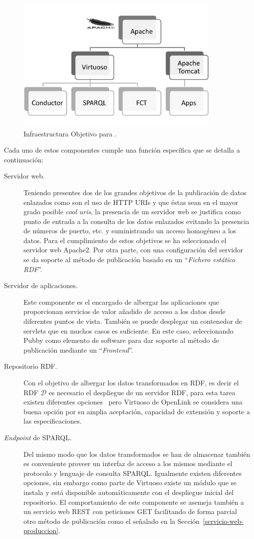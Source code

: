 \begin{figure}[!htp]
\centering
	\includegraphics[width=10cm]{images/phd/infra-ld}
	\caption{Infraestructura Objetivo para \linkeddata.}
	\label{fig:infra-ld}
\end{figure}

Cada uno de estos componentes cumple una función específica que se detalla a continuación:
\begin{description}
 \item [Servidor web.] Teniendo presentes dos de los grandes objetivos de la publicación de datos enlazados como son el uso 
de HTTP URIs y que éstas sean en el mayor grado posible \textit{cool uris}, la presencia de un servidor web se justifica como punto 
de entrada a la consulta de los datos enlazados evitando la presencia de números de puerto, etc. y suministrando un acceso 
homogéneo a los datos. Para el cumplimiento de estos objetivos se ha seleccionado el servidor web Apache2. Por otra parte, con una configuración 
del servidor se da soporte al método de publicación basado en un ``\textit{Fichero estático RDF}''.
\item [Servidor de aplicaciones.] Este componente es el encargado de albergar las aplicaciones que proporcionan servicios de valor añadido 
de acceso a los datos desde diferentes puntos de vista. También se puede desplegar un contenedor de servlets que en muchos casos es suficiente. En este caso, 
seleccionando Pubby como elemento de software para dar soporte al método de publicación mediante un ``\linkeddata \textit{Frontend}''.
\item [Repositorio RDF.] Con el objetivo de albergar los datos transformados en RDF, es decir el \dataset RDF $\mathcal{D}$ es necesario el despliegue 
de un servidor RDF, para esta tarea existen diferentes opciones~\cite{5638466} pero Virtuoso de OpenLink se considera una buena opción por su amplia aceptación, 
capacidad de extensión y soporte a las especificaciones.
\item [\textit{Endpoint} de \gls{SPARQL}.] Del mismo modo que los datos transformados se han de almacenar también es conveniente proveer un interfaz de acceso 
a los mismos mediante el protocolo y lenguaje de consulta SPARQL. Igualmente existen diferentes opciones, sin embargo como parte de Virtuoso existe un módulo 
que se instala y está disponible automáticamente con el despliegue inicial del repositorio. El comportamiento de este componente se asemeja también a 
un servicio web \gls{REST} con peticiones GET facilitando de forma parcial otro método de publicación como el señalado en la Sección~\ref{servicio-web-produccion}.
\end{description}
% 
